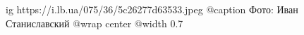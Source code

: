  
 
 
 
 

\ifcmt
  ig https://i.lb.ua/075/36/5c26277d63533.jpeg
	@caption Фото: Иван Станиславский
  @wrap center
  @width 0.7
\fi
